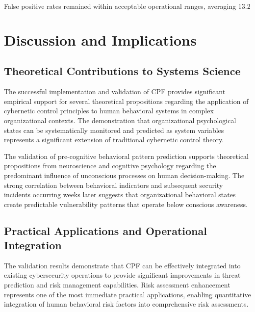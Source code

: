 \documentclass[journal]{IEEEtran}
\begin{document}
False positive rates remained within acceptable operational ranges, averaging 13.2%

\section{Discussion and Implications}

\subsection{Theoretical Contributions to Systems Science}

The successful implementation and validation of CPF provides significant empirical support for several theoretical propositions regarding the application of cybernetic control principles to human behavioral systems in complex organizational contexts. The demonstration that organizational psychological states can be systematically monitored and predicted as system variables represents a significant extension of traditional cybernetic control theory.

The validation of pre-cognitive behavioral pattern prediction supports theoretical propositions from neuroscience and cognitive psychology regarding the predominant influence of unconscious processes on human decision-making. The strong correlation between behavioral indicators and subsequent security incidents occurring weeks later suggests that organizational behavioral states create predictable vulnerability patterns that operate below conscious awareness.

\subsection{Practical Applications and Operational Integration}

The validation results demonstrate that CPF can be effectively integrated into existing cybersecurity operations to provide significant improvements in threat prediction and risk management capabilities. Risk assessment enhancement represents one of the most immediate practical applications, enabling quantitative integration of human behavioral risk factors into comprehensive risk assessments.
\end{document}
